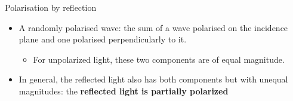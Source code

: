 %
%
%

\begin{frame}{Polarisation by reflection}

\begin{itemize}
 \item
     A randomly polarised wave: the sum of a wave polarised
     on the incidence plane and one polarised perpendicularly to it.
    \begin{itemize}
       \item
          For unpolarized light, these two components are of equal magnitude.
    \end{itemize}
  \item
      In general, the reflected light also has both components but
      with unequal magnitudes:
      the {\bf reflected light is partially polarized}
\end{itemize}


\end{frame}
